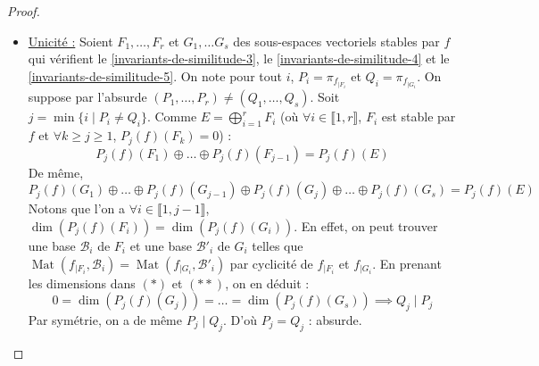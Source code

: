 \begin{proof}
\begin{itemize}
\[      \]
      Par définition de $\Gamma$, $\varphi$ est surjective. Soit $g \in \ker(\varphi)$. On a alors $e_k^* \circ g = 0$, et comme $g \in \mathbb{K}[f]$,
      \[ g = \lambda_1 \id + \dots \lambda_p f^{p-1} \text{ avec } \lambda_p \neq 0 \text{ et } p \leq k \]
      On a donc $0 = e_k^* \circ g(f^{k-p} (x)) = \lambda_p \neq 0$. Ainsi, $g = 0$ et $\phi$ est un isomorphisme. Donc $\dim(\operatorname{Vect}(\Gamma)) = \dim(\mathbb{K}[f]) = k$ par le \cref{invariants-de-similitude-1}, ce que l'on voulait.
      \newpar
      Soit $P_1$ le polynôme minimal de $f_{|F}$ (qui est le polynôme minimal de $f$ car $P_1 = \pi_{f_{|F}} = \underset{\pi_f = P_x}{=} \pi_f$). Soit $P_2$ le polynôme minimal de $f_{|G}$. Comme $G$ est stable par $f$, on a $P_1(f_{|G}) = \pi_f(f_{|G}) = 0$, donc $P_2 \mid P_1$. Il suffit alors de réitérer en remplaçant $f$ par $f_{|G}$ et $E$ par $G$ pour obtenir la décomposition voulu.
      \item \uline{Unicité :} Soient $F_1, \dots, F_r$ et $G_1, \dots G_s$ des sous-espaces vectoriels stables par $f$ qui vérifient le \cref{invariants-de-similitude-3}, le \cref{invariants-de-similitude-4} et le \cref{invariants-de-similitude-5}. On note pour tout $i$, $P_i = \pi_{f_{|F_i}}$ et $Q_i = \pi_{f_{|G_i}}$. On suppose par l'absurde $(P_1, \dots, P_r) \neq (Q_1, \dots, Q_s)$. Soit $j = \min\{ i \mid P_i \neq Q_i \}$.
      Comme $E = \bigoplus_{i = 1}^r F_i$ (où $\forall i \in \llbracket 1, r \rrbracket$, $F_i$ est stable par $f$ et $\forall k \geq j \geq 1$, $P_j(f)(F_k) = 0$) :
      \[ P_j(f)(F_1) \oplus \dots \oplus P_j(f)(F_{j-1}) = P_j(f)(E) \tag{$*$} \]
      De même,
      \[ P_j(f)(G_1) \oplus \dots \oplus P_j(f)(G_{j-1}) \oplus P_j(f)(G_j) \oplus \dots \oplus P_j(f)(G_s) = P_j(f)(E) \tag{$**$} \]
      Notons que l'on a $\forall i \in \llbracket 1, j-1 \rrbracket$, $\dim(P_j(f)(F_i)) = \dim(P_j(f)(G_i))$. En effet, on peut trouver une base $\mathcal{B}_i$ de $F_i$ et une base $\mathcal{B}'_i$ de $G_i$ telles que $\operatorname{Mat}(f_{|F_i}, \mathcal{B}_i) = \operatorname{Mat}(f_{|G_i}, \mathcal{B}'_i)$ par cyclicité de $f_{|F_i}$ et $f_{|G_i}$. En prenant les dimensions dans $(*)$ et $(**)$, on en déduit :
      \[ 0 = \dim(P_j(f)(G_j)) = \dots = \dim(P_j(f)(G_s)) \implies Q_j \mid P_j \]
      Par symétrie, on a de même $P_j \mid Q_j$. D'où $P_j = Q_j$ : absurde.
    \end{itemize}
  \end{proof}


